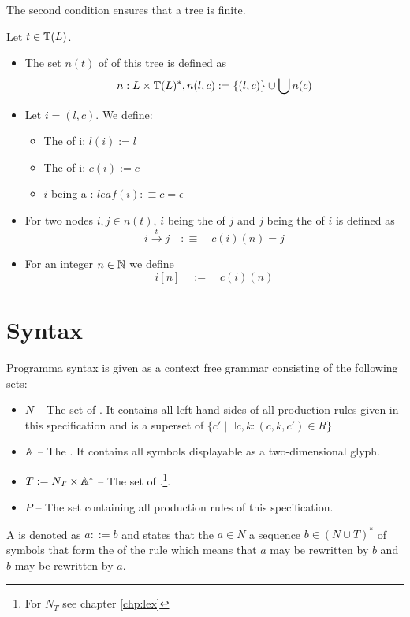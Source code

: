 The second condition ensures that a tree is finite.

Let $t \in \mathbb{T}(L)$. 

\begin{itemize}
\item The set $n(t)$ of  of this tree is defined as 
\[n : L \times \mathbb{T}(L)^\ast, n(l, c) := \{ (l,c) \} \cup \bigcup n(c) \]

\item Let $i = (l, c)$. We define:

\begin{itemize}
\item The  of i: $l(i) := l$
\item The  of i: $c(i) := c$
\item $i$ being a : $leaf(i) : \equiv  c = \epsilon$
\end{itemize}

\item For two nodes $i, j \in n(t)$, $i$ being the  of $j$ and $j$ being the  of $i$ is defined as 
\[i \stackrel{t}{\rightarrow} j \quad : \equiv \quad c(i)(n) = j\]

\item For an integer $n  \in \mathbb{N}$ we define \[i [n]  \quad := \quad c(i)(n)\] 
\end{itemize} 

\section{Syntax}\label{sec:syntax}

Programma syntax is given as a context free grammar consisting of the following sets:
\begin{itemize}
\item $N$ -- The set of . It contains all left hand sides of all production rules given in this specification and is a superset of $\{c' \mid \exists c, k : (c, k, c') \in R\}$
\item $\mathbb{A}$ -- The . It contains all symbols displayable as a two-dimensional glyph.
\item $T := N_T \times \mathbb{A}^ \ast$ -- The set of .\footnote{For $N_T$ see chapter \ref{chp:lex}}.
\item $P$ -- The set containing all production rules of this specification.
\end{itemize}
\medskip 
A  is denoted as $a ::= b$ and states that the  $a \in N$  a sequence $b \in (N \cup T)^ \ast$ of symbols that form the  of the rule which means that $a$ may be rewritten by $b$ and $b$ may be rewritten by $a$.

